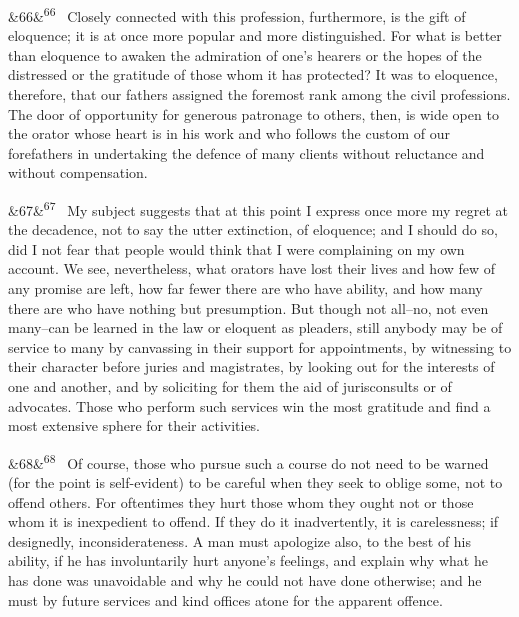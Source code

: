 \documentclass[12pt]{article}
\newcommand{\para}[1][]{\par\noindent\ifx&#1&\else\textsuperscript{\footnotesize #1}~\fi}
\begin{document}
\para[66] Closely connected with this profession, furthermore, is the gift of eloquence; it is at once more popular and more distinguished. For what is better than eloquence to awaken the admiration of one's hearers or the hopes of the distressed or the gratitude of those whom it has protected? It was to eloquence, therefore, that our fathers assigned the foremost rank among the civil professions. The door of opportunity for generous patronage to others, then, is wide open to the orator whose heart is in his work and who follows the custom of our forefathers in undertaking the defence of many clients without reluctance and without compensation.

\para[67] My subject suggests that at this point I express once more my regret at the decadence, not to say the utter extinction, of eloquence; and I should do so, did I not fear that people would think that I were complaining on my own account. We see, nevertheless, what orators have lost their lives and how few of any promise are left, how far fewer there are who have ability, and how many there are who have nothing but presumption. But though not all--no, not even many--can be learned in the law or eloquent as pleaders, still anybody may be of service to many by canvassing in their support for appointments, by witnessing to their character before juries and magistrates, by looking out for the interests of one and another, and by soliciting for them the aid of jurisconsults or of advocates. Those who perform such services win the most gratitude and find a most extensive sphere for their activities.

\para[68] Of course, those who pursue such a course do not need to be warned (for the point is self-evident) to be careful when they seek to oblige some, not to offend others. For oftentimes they hurt those whom they ought not or those whom it is inexpedient to offend. If they do it inadvertently, it is carelessness; if designedly, inconsiderateness. A man must apologize also, to the best of his ability, if he has involuntarily hurt anyone's feelings, and explain why what he has done was unavoidable and why he could not have done otherwise; and he must by future services and kind offices atone for the apparent offence.
\end{document}
